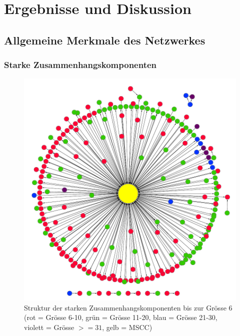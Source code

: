 
\chapter{Ergebnisse und Diskussion}
\label{ch:Ergebnisse}

\section{Allgemeine Merkmale des Netzwerkes}
\label{sec:result-allg-merkm-des}

\subsection{Starke Zusammenhangskomponenten}
\label{sec:result-komponentenstruktur}

\begin{figure}[t]
  \centering
  \includegraphics[scale=1.0]{images/component-metagraph-8.pdf}
  \caption{Struktur der starken Zusammenhangskomponenten bis zur
    Grösse 6 (rot = Grösse 6-10, grün = Grösse 11-20, blau = Grösse
    21-30, violett = Grösse $>= 31$, gelb = MSCC)}
  \label{fig:komponenten-struktur}
\end{figure}


